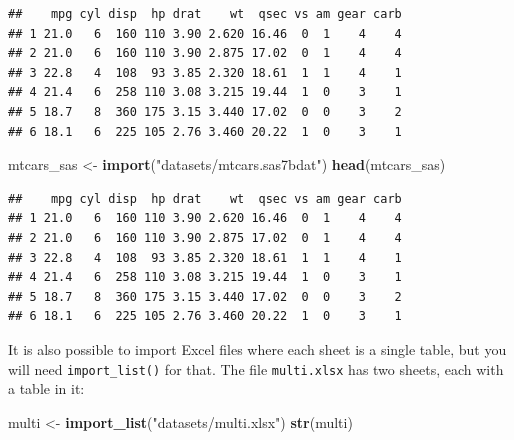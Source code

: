 \documentclass[]{gitbook}
\newenvironment{Shaded}{\begin{snugshade}}{\end{snugshade}}
\newcommand{\KeywordTok}[1]{\textcolor[rgb]{0.13,0.29,0.53}{\textbf{#1}}}
\newcommand{\NormalTok}[1]{#1}
\newcommand{\StringTok}[1]{\textcolor[rgb]{0.31,0.60,0.02}{#1}}
\theoremstyle{definition}
\theoremstyle{definition}
\theoremstyle{definition}
\theoremstyle{remark}
\begin{document}
\begin{verbatim}
##    mpg cyl disp  hp drat    wt  qsec vs am gear carb
## 1 21.0   6  160 110 3.90 2.620 16.46  0  1    4    4
## 2 21.0   6  160 110 3.90 2.875 17.02  0  1    4    4
## 3 22.8   4  108  93 3.85 2.320 18.61  1  1    4    1
## 4 21.4   6  258 110 3.08 3.215 19.44  1  0    3    1
## 5 18.7   8  360 175 3.15 3.440 17.02  0  0    3    2
## 6 18.1   6  225 105 2.76 3.460 20.22  1  0    3    1
\end{verbatim}

\begin{Shaded}
\begin{Highlighting}[]
\NormalTok{mtcars_sas <-}\StringTok{ }\KeywordTok{import}\NormalTok{(}\StringTok{"datasets/mtcars.sas7bdat"}\NormalTok{)}
\KeywordTok{head}\NormalTok{(mtcars_sas)}
\end{Highlighting}
\end{Shaded}

\begin{verbatim}
##    mpg cyl disp  hp drat    wt  qsec vs am gear carb
## 1 21.0   6  160 110 3.90 2.620 16.46  0  1    4    4
## 2 21.0   6  160 110 3.90 2.875 17.02  0  1    4    4
## 3 22.8   4  108  93 3.85 2.320 18.61  1  1    4    1
## 4 21.4   6  258 110 3.08 3.215 19.44  1  0    3    1
## 5 18.7   8  360 175 3.15 3.440 17.02  0  0    3    2
## 6 18.1   6  225 105 2.76 3.460 20.22  1  0    3    1
\end{verbatim}

It is also possible to import Excel files where each sheet is a single
table, but you will need \texttt{import\_list()} for that. The file
\texttt{multi.xlsx} has two sheets, each with a table in it:

\begin{Shaded}
\begin{Highlighting}[]
\NormalTok{multi <-}\StringTok{ }\KeywordTok{import_list}\NormalTok{(}\StringTok{"datasets/multi.xlsx"}\NormalTok{)}
\KeywordTok{str}\NormalTok{(multi)}
\end{Highlighting}
\end{Shaded}
\end{document}
